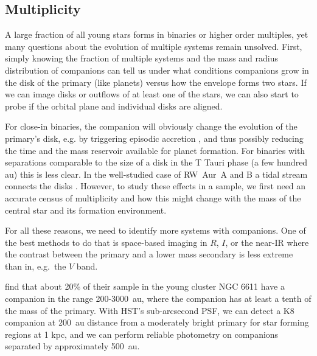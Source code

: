 \documentclass[12pt]{article}
\begin{document}
\subsection{Multiplicity}
A large fraction of all young stars forms in binaries or higher order multiples, yet many questions about the evolution of multiple systems remain unsolved. First, simply knowing the fraction of multiple systems and the mass and radius distribution of companions can tell us under what conditions companions grow in the disk of the primary (like planets) versus how the envelope forms two stars. If we can image disks or outflows of at least one of the stars, we can also start to probe if the orbital plane and individual disks are aligned.

For close-in binaries, the companion will obviously change the evolution of the primary's disk, e.g. by triggering episodic accretion \citep{2013ApJ...766...62G}, and thus possibly reducing the time and the mass reservoir available for planet formation. For binaries with separations comparable to the size of a disk in the T Tauri phase (a few hundred au) this is less clear. In the well-studied case of RW~Aur~A and B a tidal stream connects the disks \citep{2006A&A...452..897C}. However, to study these effects in a sample, we first need an accurate census of multiplicity and how this might change with the mass of the central star and its formation environment.

For all these reasons, we need to identify more systems with companions. One of
the best methods to do that is space-based imaging in $R$, $I$, or the near-IR where the contrast between the primary and a lower mass secondary is less extreme than in, e.g.\ the $V$ band. 

\citet{2001A&A...379..147D} find that about 20\% of their sample in the young
cluster NGC 6611 have a companion in the range 200-3000~au, where the companion
has at least a tenth of the mass of the primary. With HST's sub-arcsecond PSF,
we can detect a K8 companion at 200~au distance from a moderately bright
primary for star forming regions at 1 kpc, and we can perform reliable photometry on companions separated by approximately 500~au. 
\end{document}
